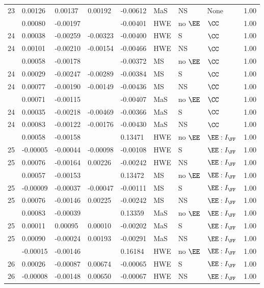 \begin{longtable}[t]{lllllllll}
23 & 0.00126 & 0.00137 & 0.00192 & -0.00612 & MaS & NS & None & 1.00\\
\addlinespace
24 & 0.00080 & -0.00197 &  & -0.00401 & HWE & no $\EE$ & $\CC$ & 1.00\\
24 & 0.00038 & -0.00259 & -0.00323 & -0.00400 & HWE & S & $\CC$ & 1.00\\
24 & 0.00101 & -0.00210 & -0.00154 & -0.00466 & HWE & NS & $\CC$ & 1.00\\
\addlinespace
24 & 0.00058 & -0.00178 &  & -0.00372 & MS & no $\EE$ & $\CC$ & 1.00\\
24 & 0.00029 & -0.00247 & -0.00289 & -0.00384 & MS & S & $\CC$ & 1.00\\
24 & 0.00077 & -0.00190 & -0.00149 & -0.00436 & MS & NS & $\CC$ & 1.00\\
\addlinespace
24 & 0.00071 & -0.00115 &  & -0.00407 & MaS & no $\EE$ & $\CC$ & 1.00\\
24 & 0.00035 & -0.00218 & -0.00469 & -0.00366 & MaS & S & $\CC$ & 1.00\\
24 & 0.00083 & -0.00122 & -0.00176 & -0.00430 & MaS & NS & $\CC$ & 1.00\\
\addlinespace
25 & 0.00058 & -0.00158 &  & 0.13471 & HWE & no $\EE$ & $\EE:I_{\FF}$ & 1.00\\
25 & -0.00005 & -0.00044 & -0.00098 & -0.00108 & HWE & S & $\EE:I_{\FF}$ & 1.00\\
25 & 0.00076 & -0.00164 & 0.00226 & -0.00242 & HWE & NS & $\EE:I_{\FF}$ & 1.00\\
\addlinespace
25 & 0.00057 & -0.00153 &  & 0.13472 & MS & no $\EE$ & $\EE:I_{\FF}$ & 1.00\\
25 & -0.00009 & -0.00037 & -0.00047 & -0.00111 & MS & S & $\EE:I_{\FF}$ & 1.00\\
25 & 0.00076 & -0.00146 & 0.00225 & -0.00242 & MS & NS & $\EE:I_{\FF}$ & 1.00\\
\addlinespace
25 & 0.00083 & -0.00039 &  & 0.13359 & MaS & no $\EE$ & $\EE:I_{\FF}$ & 1.00\\
25 & 0.00011 & 0.00095 & 0.00010 & -0.00202 & MaS & S & $\EE:I_{\FF}$ & 1.00\\
25 & 0.00090 & -0.00024 & 0.00193 & -0.00291 & MaS & NS & $\EE:I_{\FF}$ & 1.00\\
\addlinespace
26 & -0.00015 & -0.00146 &  & 0.16184 & HWE & no $\EE$ & $\EE:I_{\FF}$ & 1.00\\
26 & 0.00026 & -0.00087 & 0.00674 & -0.00065 & HWE & S & $\EE:I_{\FF}$ & 1.00\\
26 & -0.00008 & -0.00148 & 0.00650 & -0.00067 & HWE & NS & $\EE:I_{\FF}$ & 1.00\\

\end{longtable}
